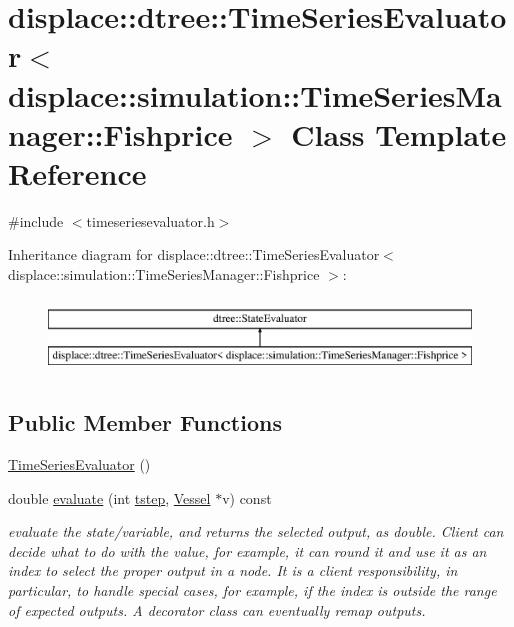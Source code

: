 \hypertarget{classdisplace_1_1dtree_1_1_time_series_evaluator_3_01displace_1_1simulation_1_1_time_series_manager_1_1_fishprice_01_4}{}\section{displace\+::dtree\+::Time\+Series\+Evaluator$<$ displace\+::simulation\+::Time\+Series\+Manager\+::Fishprice $>$ Class Template Reference}
\label{classdisplace_1_1dtree_1_1_time_series_evaluator_3_01displace_1_1simulation_1_1_time_series_manager_1_1_fishprice_01_4}


{\ttfamily \#include $<$timeseriesevaluator.\+h$>$}

Inheritance diagram for displace\+::dtree\+::Time\+Series\+Evaluator$<$ displace\+::simulation\+::Time\+Series\+Manager\+::Fishprice $>$\+:\begin{figure}[H]
\begin{center}
\leavevmode
\includegraphics[height=2.000000cm]{d0/d8e/classdisplace_1_1dtree_1_1_time_series_evaluator_3_01displace_1_1simulation_1_1_time_series_manager_1_1_fishprice_01_4}
\end{center}
\end{figure}
\subsection*{Public Member Functions}
\begin{DoxyCompactItemize}
\item 
\mbox{\hyperlink{classdisplace_1_1dtree_1_1_time_series_evaluator_3_01displace_1_1simulation_1_1_time_series_manager_1_1_fishprice_01_4_abd117ee17fb8ff4ae621aa47266ec4ad}{Time\+Series\+Evaluator}} ()
\item 
double \mbox{\hyperlink{classdisplace_1_1dtree_1_1_time_series_evaluator_3_01displace_1_1simulation_1_1_time_series_manager_1_1_fishprice_01_4_aeb9f91b082019b408710115c5121aadf}{evaluate}} (int \mbox{\hyperlink{thread__vessels_8cpp_a84bc73d278de929ec9974e1a95d9b23a}{tstep}}, \mbox{\hyperlink{class_vessel}{Vessel}} $\ast$v) const
\begin{DoxyCompactList}\small\item\em evaluate the state/variable, and returns the selected output, as double. Client can decide what to do with the value, for example, it can round it and use it as an index to select the proper output in a node. It is a client responsibility, in particular, to handle special cases, for example, if the index is outside the range of expected outputs. A decorator class can eventually remap outputs. \end{DoxyCompactList}\end{DoxyCompactItemize}


